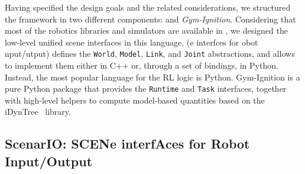 Having specified the design goals and the related considerations, we structured the framework in two different components: \emph{\scenario} and \emph{Gym-Ignition}.
Considering that most of the robotics libraries and simulators are available in \cpp, we designed the low-level unified scene interfaces in this language.
\scenario (e interfces for obot nput/utput) defines the \verb|World|, \verb|Model|, \verb|Link|, and \verb|Joint| abstractions, and allows to implement them either in C++ or, through a set of bindings, in Python.
Instead, the most popular language for the \ac{RL} logic is Python.
Gym-Ignition is a pure Python package that provides the \verb|Runtime| and \verb|Task| interfaces, together with high-level helpers to compute model-based quantities based on the iDynTree~\parencite{nori_icub_2015} library.

\begin{addmargin}{-0.6cm}
\section{ScenarIO: SCENe interfAces for Robot Input/Output}
\end{addmargin}

